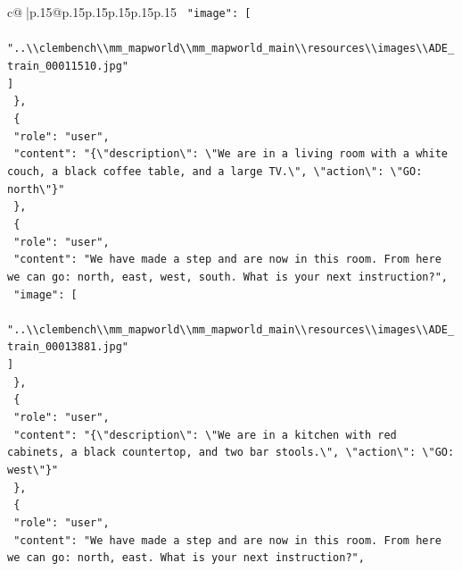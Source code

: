 \documentclass{article}
\begin{document}
{\begin{supertabular}{c@{$\;$}|p{.15\linewidth}@{}p{.15\linewidth}p{.15\linewidth}p{.15\linewidth}p{.15\linewidth}p{.15\linewidth}}
{{{\texttt{    "image": {[}} \\
\texttt{      "..\textbackslash{}\textbackslash{}clembench\textbackslash{}\textbackslash{}mm\_mapworld\textbackslash{}\textbackslash{}mm\_mapworld\_main\textbackslash{}\textbackslash{}resources\textbackslash{}\textbackslash{}images\textbackslash{}\textbackslash{}ADE\_train\_00011510.jpg"} \\
\texttt{    {]}} \\
\texttt{  \},} \\
\texttt{  \{} \\
\texttt{    "role": "user",} \\
\texttt{    "content": "\{\textbackslash{}"description\textbackslash{}": \textbackslash{}"We are in a living room with a white couch, a black coffee table, and a large TV.\textbackslash{}", \textbackslash{}"action\textbackslash{}": \textbackslash{}"GO: north\textbackslash{}"\}"} \\
\texttt{  \},} \\
\texttt{  \{} \\
\texttt{    "role": "user",} \\
\texttt{    "content": "We have made a step and are now in this room. From here we can go: north, east, west, south. What is your next instruction?",} \\
\texttt{    "image": {[}} \\
\texttt{      "..\textbackslash{}\textbackslash{}clembench\textbackslash{}\textbackslash{}mm\_mapworld\textbackslash{}\textbackslash{}mm\_mapworld\_main\textbackslash{}\textbackslash{}resources\textbackslash{}\textbackslash{}images\textbackslash{}\textbackslash{}ADE\_train\_00013881.jpg"} \\
\texttt{    {]}} \\
\texttt{  \},} \\
\texttt{  \{} \\
\texttt{    "role": "user",} \\
\texttt{    "content": "\{\textbackslash{}"description\textbackslash{}": \textbackslash{}"We are in a kitchen with red cabinets, a black countertop, and two bar stools.\textbackslash{}", \textbackslash{}"action\textbackslash{}": \textbackslash{}"GO: west\textbackslash{}"\}"} \\
\texttt{  \},} \\
\texttt{  \{} \\
\texttt{    "role": "user",} \\
\texttt{    "content": "We have made a step and are now in this room. From here we can go: north, east. What is your next instruction?",} \\
}}}
\end{supertabular}}
\end{document}
